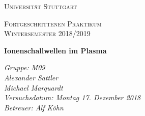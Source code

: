 \documentclass[aps,amsmath,amssymb,amsfont]{revtex4-1}
\numberwithin{equation}{section}
\begin{document}
	\begin{titlepage}
	\centering
	\par\vspace{1cm}
	{\scshape\LARGE Universität Stuttgart \par}
	\vspace{1cm}
	{\scshape\Large  Fortgeschrittenen Praktikum \\ Wintersemester 2018/2019\par}
	\vspace{1.5cm}
	{\huge\bfseries Ionenschallwellen im Plasma\par}
	\vspace{2cm}
	{\Large\itshape Gruppe: M09\\ Alexander Sattler  \\  Michael Marquardt    \\ Versuchsdatum: Montag 17. Dezember 2018\\ Betreuer: Alf Köhn\\ \par}
	
	\end{titlepage}


\tableofcontents




%
{}
\end{document}
